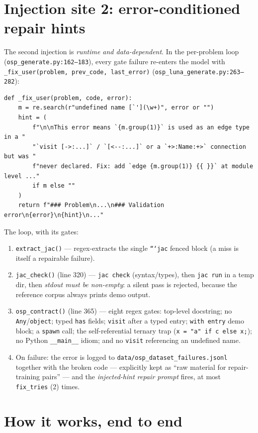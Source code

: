 \documentclass[11pt]{article}
\newcommand{\file}[1]{\texttt{#1}}
\newcommand{\code}[1]{\texttt{#1}}
\begin{document}
\section{Injection site 2: error-conditioned repair hints}

The second injection is \emph{runtime and data-dependent}. In the per-problem
loop (\file{osp\_generate.py:162--183}), every gate failure re-enters the
model with \code{\_fix\_user(problem, prev\_code, last\_error)}
(\file{osp\_luna\_generate.py:263--282}):

\begin{lstlisting}[numbers=none]
def _fix_user(problem, code, error):
    m = re.search(r"undefined name [`'](\w+)", error or "")
    hint = (
        f"\n\nThis error means `{m.group(1)}` is used as an edge type in a "
        "`visit [->:...]` / `[<--:...]` or a `+>:Name:+>` connection but was "
        f"never declared. Fix: add `edge {m.group(1)} {{ }}` at module level ..."
        if m else ""
    )
    return f"### Problem\n...\n### Validation error\n{error}\n{hint}\n..."
\end{lstlisting}

The loop, with its gates:

\begin{enumerate}
  \item \code{extract\_jac()} --- regex-extracts the single \code{```jac}
  fenced block (a miss is itself a repairable failure).
  \item \code{jac\_check()} (line 320) --- \code{jac check} (syntax/types),
  then \code{jac run} in a temp dir, then \emph{stdout must be non-empty}:
  a silent pass is rejected, because the reference corpus always prints demo
  output.
  \item \code{osp\_contract()} (line 365) --- eight regex gates: top-level
  docstring; no \code{Any}/\code{object}; typed \code{has} fields;
  \code{visit} after a typed entry; \code{with entry} demo block;
  a \code{spawn} call; the self-referential ternary trap
  (\code{x = "a" if c else x;}); no Python \code{\_\_main\_\_} idiom; and no
  \code{visit} referencing an undefined name.
  \item On failure: the error is logged to
  \file{data/osp\_dataset\_failures.jsonl} together with the broken code ---
  explicitly kept as ``raw material for repair-training pairs'' --- and the
  \emph{injected-hint repair prompt} fires, at most \code{fix\_tries} (2)
  times.
\end{enumerate}

\section{How it works, end to end}
\end{document}
